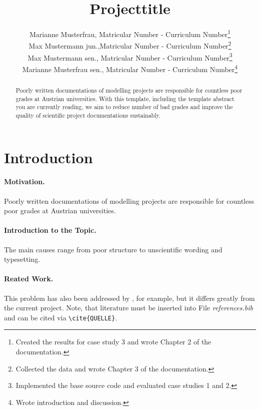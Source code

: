 \documentclass[a4paper,11pt]{scrartcl}
\begin{document}
\subject{LVA-Title}
\title{Projecttitle}

\publishers{Supervisor: Max Mustermann}
\author{Marianne Musterfrau, Matricular Number - Curriculum Number\footnote{Created the results for case study 3 and wrote Chapter 2 of the documentation.}\\
Max Mustermann jun.,Matricular Number - Curriculum Number\footnote{Collected the data and wrote Chapter 3 of the documentation.}\\
Max Mustermann sen., Matricular Number - Curriculum Number\footnote{Implemented the base source code and evaluated case studies 1 and 2.}\\
Marianne Musterfrau sen., Matricular Number - Curriculum Number\footnote{Wrote introduction and discussion.}}

\maketitle

\begin{abstract}
Poorly written documentations of modelling projects are responsible for countless poor grades at Austrian universities. With this template, including the template abstract you are currently reading, we aim to reduce number of bad grades and improve the quality of scientific project documentations sustainably.
\end{abstract}

\newpage

\tableofcontents

\newpage

\section{Introduction}
\paragraph{Motivation.} 
Poorly written documentations of modelling projects are responsible for countless poor grades at Austrian universities. 
\paragraph{Introduction to the Topic.} The main causes range from poor structure to unscientific wording and typesetting.
\paragraph{Reated Work.} This problem has also been addressed by \cite{zeigler2000theory}, for example, but it differs greatly from the current project. Note, that literature must be inserted into File \textit{references.bib} and can be cited via \verb|\cite{QUELLE}|.
\end{document}
